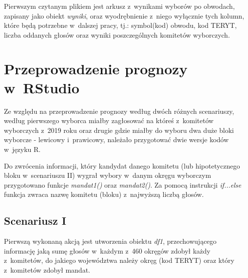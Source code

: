 Pierwszym czytanym plikiem jest arkusz z~wynikami wyborów po obwodach, zapisany jako obiekt \textit{wyniki}, oraz wyodrębnienie z~niego wyłącznie tych kolumn, które będą potrzebne w~dalszej pracy, tj.: symbol(kod) obwodu, kod TERYT, liczba oddanych głosów oraz wyniki poszczególnych komitetów wyborczych.

\newpage

\section{Przeprowadzenie prognozy w~RStudio}

Ze względu na przeprowadzenie prognozy według dwóch różnych scenariuszy, według pierwszego wyborca miałby zagłosować na któreś z~komitetów wyborczych z~2019 roku oraz drugie gdzie miałby do wyboru dwa duże bloki wyborcze - lewicowy i~prawicowy, należało przygotować dwie wersje kodów w~języku R.

Do zwrócenia informacji, który kandydat danego komitetu (lub hipotetycznego bloku w~scenariuszu II) wygrał wybory w~danym okręgu wyborczym przygotowano funkcje \textit{mandat1()} oraz \textit{mandat2()}. Za pomocą instrukcji \textit{if...else} funkcja zwraca nazwę komitetu (bloku) z~najwyższą liczbą głosów.

\subsection{Scenariusz I}
Pierwszą wykonaną akcją jest utworzenia obiektu \textit{df1}, przechowującego informację jaką sumę głosów w~każdym z~460 okręgów zdobył każdy z~komitetów, do jakiego województwa należy okręg (kod TERYT) oraz który z~komitetów zdobył mandat.

